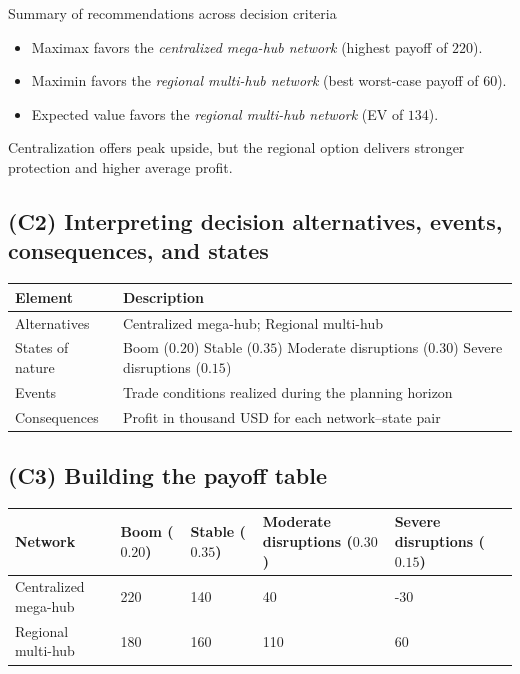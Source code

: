 \documentclass[11pt]{article}
\begin{document}
	Summary of recommendations across decision criteria
	\begin{itemize}
		\item Maximax favors the \emph{centralized mega-hub network} (highest payoff of $220$).
		\item Maximin favors the \emph{regional multi-hub network} (best worst-case payoff of $60$).
		\item Expected value favors the \emph{regional multi-hub network} (EV of $134$).
	\end{itemize}
	
	
	Centralization offers peak upside, but the regional option delivers stronger protection and higher average profit.
	
	\subsection*{(C2) Interpreting decision alternatives, events, consequences, and states}
	
	\hypertarget{problem3-c2}{}
	
	\begin{center}
		\begin{tabular}{ll}
			\toprule
			Element & Description \\
			\midrule
			Alternatives & Centralized mega-hub; Regional multi-hub \\
			States of nature & Boom
			($0.20$)
			Stable
			($0.35$)
			Moderate disruptions
			($0.30$)
			Severe disruptions
			($0.15$) \\
			Events & Trade conditions realized during the planning horizon \\
			Consequences & Profit in thousand USD for each network–state pair \\
			\bottomrule
		\end{tabular}
	\end{center}
	
	\subsection*{(C3) Building the payoff table}
	
	\hypertarget{problem3-c3}{}
	
	\begin{center}
		\begin{tabular}{lllll}
			\toprule
			Network & Boom
			($0.20$) & Stable
			($0.35$) & Moderate disruptions
			($0.30$) & Severe disruptions
			($0.15$) \\
			\midrule
			Centralized mega-hub & 220 & 140 & 40 & -30 \\
			Regional multi-hub & 180 & 160 & 110 & 60 \\
			\bottomrule
		\end{tabular}
	\end{center}
	
\end{document}
